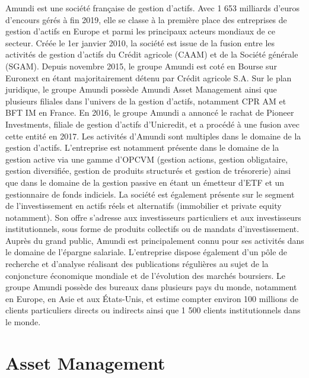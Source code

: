 Amundi est une société française de gestion d'actifs. Avec 1 653 milliards d'euros d'encours gérés à fin 2019, elle se classe à la première place des entreprises de gestion d'actifs en Europe et parmi les principaux acteurs mondiaux de ce secteur.
Créée le 1er janvier 2010, la société est issue de la fusion entre les activités de gestion d'actifs du Crédit agricole (CAAM) et de la Société générale (SGAM). Depuis novembre 2015, le groupe Amundi est coté en Bourse sur Euronext en étant majoritairement détenu par Crédit agricole S.A.
Sur le plan juridique, le groupe Amundi possède Amundi Asset Management ainsi que plusieurs filiales dans l'univers de la gestion d'actifs, notamment CPR AM et BFT IM en France. En 2016, le groupe Amundi a annoncé le rachat de Pioneer Investments, filiale de gestion d'actifs d'Unicredit, et a procédé à une fusion avec cette entité en 2017.
Les activités d'Amundi sont multiples dans le domaine de la gestion d'actifs. L'entreprise est notamment présente dans le domaine de la gestion active via une gamme d'OPCVM (gestion actions, gestion obligataire, gestion diversifiée, gestion de produits structurés et gestion de trésorerie) ainsi que dans le domaine de la gestion passive en étant un émetteur d'ETF et un gestionnaire de fonds indiciels. La société est également présente sur le segment de l'investissement en actifs réels et alternatifs (immobilier et private equity notamment). Son offre s’adresse aux investisseurs particuliers et aux investisseurs institutionnels, sous forme de produits collectifs ou de mandats d’investissement. Auprès du grand public, Amundi est principalement connu pour ses activités dans le domaine de l'épargne salariale. L'entreprise dispose également d'un pôle de recherche et d'analyse réalisant des publications régulières au sujet de la conjoncture économique mondiale et de l'évolution des marchés boursiers.
Le groupe Amundi possède des bureaux dans plusieurs pays du monde, notamment en Europe, en Asie et aux États-Unis, et estime compter environ 100 millions de clients particuliers directs ou indirects ainsi que 1 500 clients institutionnels dans le monde.

\section{Asset Management}


